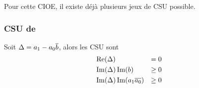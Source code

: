     Pour cette CIOE, il existe déjà plusieurs jeux de CSU possible.

    \subsubsection{CSU de \cite{stupfel_sufficient_2011}}

      \begin{prop}
        Soit \(\Delta = a_1 - a_0{\overline{b}}\), alors les CSU sont
        \begin{align}
          &\operatorname{Re}(\Delta) &= 0\\
          &\operatorname{Im}(\Delta)\operatorname{Im}(b) &\ge 0\\
          &\operatorname{Im}(\Delta)\operatorname{Im}(a_1{\overline{a_0}})&\ge 0
        \end{align}
      \end{prop}

